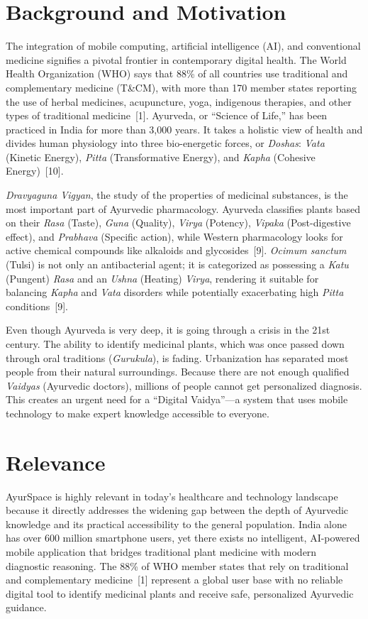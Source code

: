 \section{Background and Motivation}
\justify
The integration of mobile computing, artificial intelligence (AI), and conventional
medicine signifies a pivotal frontier in contemporary digital health. The World Health
Organization (WHO) says that 88\% of all countries use traditional and complementary
medicine (T\&CM), with more than 170 member states reporting the use of herbal medicines,
acupuncture, yoga, indigenous therapies, and other types of traditional medicine~[1]. Ayurveda,
or ``Science of Life,'' has been practiced in India for more than 3,000 years. It takes a
holistic view of health and divides human physiology into three bio-energetic forces, or
\textit{Doshas}: \textit{Vata} (Kinetic Energy), \textit{Pitta} (Transformative Energy),
and \textit{Kapha} (Cohesive Energy)~[10].

\textit{Dravyaguna Vigyan}, the study of the properties of medicinal substances, is the most
important part of Ayurvedic pharmacology. Ayurveda classifies plants based on their
\textit{Rasa} (Taste), \textit{Guna} (Quality), \textit{Virya} (Potency), \textit{Vipaka}
(Post-digestive effect), and \textit{Prabhava} (Specific action), while Western pharmacology
looks for active chemical compounds like alkaloids and glycosides~[9].
\textit{Ocimum sanctum} (Tulsi) is not only an antibacterial agent; it is categorized as
possessing a \textit{Katu} (Pungent) \textit{Rasa} and an \textit{Ushna} (Heating)
\textit{Virya}, rendering it suitable for balancing \textit{Kapha} and \textit{Vata}
disorders while potentially exacerbating high \textit{Pitta} conditions~[9].

Even though Ayurveda is very deep, it is going through a crisis in the 21st century.
The ability to identify medicinal plants, which was once passed down through oral traditions
(\textit{Gurukula}), is fading. Urbanization has separated most people from their natural
surroundings. Because there are not enough qualified \textit{Vaidyas} (Ayurvedic doctors),
millions of people cannot get personalized diagnosis. This creates an urgent need for a
``Digital Vaidya''---a system that uses mobile technology to make expert knowledge
accessible to everyone.

\newpage
\section{Relevance}
\justify
AyurSpace is highly relevant in today's healthcare and technology landscape because it
directly addresses the widening gap between the depth of Ayurvedic knowledge and its
practical accessibility to the general population. India alone has over 600 million
smartphone users, yet there exists no intelligent, AI-powered mobile application that
bridges traditional plant medicine with modern diagnostic reasoning. The 88\% of WHO
member states that rely on traditional and complementary medicine~[1] represent a global
user base with no reliable digital tool to identify medicinal plants and receive safe,
personalized Ayurvedic guidance.

